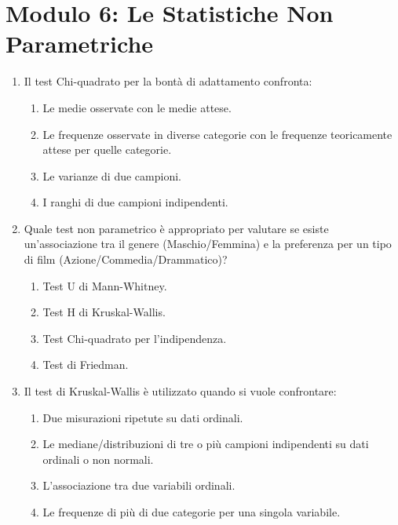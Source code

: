 \documentclass[12pt, a4paper]{article}
\begin{document}
\section*{Modulo 6: Le Statistiche Non Parametriche}
\begin{enumerate}[resume]
    \item Il test Chi-quadrato per la bontà di adattamento confronta:
    \begin{enumerate}
        \item Le medie osservate con le medie attese.
        \item Le frequenze osservate in diverse categorie con le frequenze teoricamente attese per quelle categorie.
        \item Le varianze di due campioni.
        \item I ranghi di due campioni indipendenti.
    \end{enumerate}
    \vspace{0.3cm}

    \item Quale test non parametrico è appropriato per valutare se esiste un'associazione tra il genere (Maschio/Femmina) e la preferenza per un tipo di film (Azione/Commedia/Drammatico)?
    \begin{enumerate}
        \item Test U di Mann-Whitney.
        \item Test H di Kruskal-Wallis.
        \item Test Chi-quadrato per l'indipendenza.
        \item Test di Friedman.
    \end{enumerate}
    \vspace{0.3cm}

    \item Il test di Kruskal-Wallis è utilizzato quando si vuole confrontare:
    \begin{enumerate}
        \item Due misurazioni ripetute su dati ordinali.
        \item Le mediane/distribuzioni di tre o più campioni indipendenti su dati ordinali o non normali.
        \item L'associazione tra due variabili ordinali.
        \item Le frequenze di più di due categorie per una singola variabile.
    \end{enumerate}
    \vspace{0.3cm}


\end{enumerate}
\end{document}
